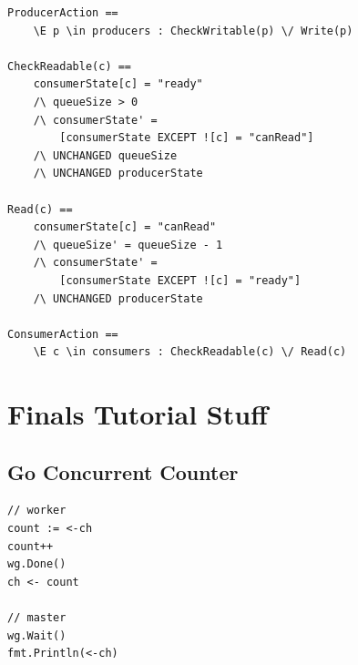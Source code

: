 \documentclass{article}
\begin{document}
\begin{lstlisting}
ProducerAction ==
    \E p \in producers : CheckWritable(p) \/ Write(p)

CheckReadable(c) == 
    consumerState[c] = "ready"
    /\ queueSize > 0
    /\ consumerState' =
        [consumerState EXCEPT ![c] = "canRead"]
    /\ UNCHANGED queueSize
    /\ UNCHANGED producerState

Read(c) ==
    consumerState[c] = "canRead"
    /\ queueSize' = queueSize - 1
    /\ consumerState' =
        [consumerState EXCEPT ![c] = "ready"]
    /\ UNCHANGED producerState

ConsumerAction ==
    \E c \in consumers : CheckReadable(c) \/ Read(c)
\end{lstlisting}

\section{Finals Tutorial Stuff}

\subsection{Go Concurrent Counter}
\begin{lstlisting}[language=Golang]
// worker
count := <-ch
count++
wg.Done()
ch <- count

// master
wg.Wait()
fmt.Println(<-ch)
\end{lstlisting}
\end{document}
